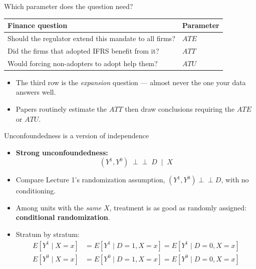 \documentclass[
  11pt,
  ignorenonframetext,
  aspectratio=169,
]{beamer}
\providecommand{\tightlist}{%
  \setlength{\itemsep}{0pt}\setlength{\parskip}{0pt}}
\newcommand{\indep}{\perp\!\!\!\perp}
\begin{document}
\begin{frame}{Which parameter does the question need?}
\protect{}\label{which-parameter-does-the-question-need}
\begin{center}
\begin{tabular}{p{5.6cm}l}
\toprule
Finance question & Parameter \\
\midrule
Should the regulator extend this mandate to all firms? & $ATE$ \\
Did the firms that adopted IFRS benefit from it? & $ATT$ \\
Would forcing non-adopters to adopt help them? & $ATU$ \\
\bottomrule
\end{tabular}
\end{center}

\vspace{0.4em}

\begin{itemize}
\tightlist
\item
  The third row is the \emph{expansion} question --- almost never the
  one your data answers well.
\item
  Papers routinely estimate the \(ATT\) then draw conclusions requiring
  the \(ATE\) or \(ATU\).
\end{itemize}
\end{frame}

\begin{frame}{Unconfoundedness is a version of independence}
\protect{}\label{unconfoundedness-is-a-version-of-independence}
\begin{itemize}
\tightlist
\item
  \textbf{Strong unconfoundedness:} \[
  (Y^1, Y^0) \;\indep\; D \;\mid\; X
  \]
\item
  Compare Lecture 1's randomization assumption, \((Y^1,Y^0) \indep D\),
  with no conditioning.
\item
  Among units with the \emph{same} \(X\), treatment is as good as
  randomly assigned: \textbf{conditional randomization}.
\item
  Stratum by stratum: \[
  \begin{aligned}
  E[Y^1 \mid X{=}x] &= E[Y^1 \mid D{=}1, X{=}x] = E[Y^1 \mid D{=}0, X{=}x] \\[0.7em]
  E[Y^0 \mid X{=}x] &= E[Y^0 \mid D{=}1, X{=}x] = E[Y^0 \mid D{=}0, X{=}x]
  \end{aligned}
  \]
\end{itemize}
\end{frame}
\end{document}

